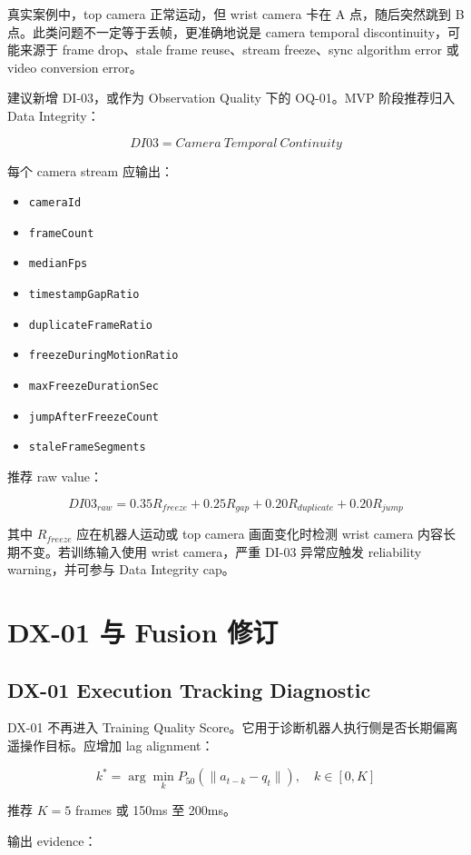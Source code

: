 \documentclass[UTF8,zihao=-4]{ctexart}
\newcommand{\Code}[1]{\texttt{#1}}
\begin{document}
真实案例中，top camera 正常运动，但 wrist camera 卡在 A 点，随后突然跳到 B 点。此类问题不一定等于丢帧，更准确地说是 camera temporal discontinuity，可能来源于 frame drop、stale frame reuse、stream freeze、sync algorithm error 或 video conversion error。

建议新增 DI-03，或作为 Observation Quality 下的 OQ-01。MVP 阶段推荐归入 Data Integrity：

\[
DI03=Camera\ Temporal\ Continuity
\]

每个 camera stream 应输出：

\begin{itemize}
\item \Code{cameraId}
\item \Code{frameCount}
\item \Code{medianFps}
\item \Code{timestampGapRatio}
\item \Code{duplicateFrameRatio}
\item \Code{freezeDuringMotionRatio}
\item \Code{maxFreezeDurationSec}
\item \Code{jumpAfterFreezeCount}
\item \Code{staleFrameSegments}
\end{itemize}

推荐 raw value：

\[
DI03_{raw}=0.35R_{freeze}+0.25R_{gap}+0.20R_{duplicate}+0.20R_{jump}
\]

其中 \(R_{freeze}\) 应在机器人运动或 top camera 画面变化时检测 wrist camera 内容长期不变。若训练输入使用 wrist camera，严重 DI-03 异常应触发 reliability warning，并可参与 Data Integrity cap。

\section{DX-01 与 Fusion 修订}

\subsection{DX-01 Execution Tracking Diagnostic}

DX-01 不再进入 Training Quality Score。它用于诊断机器人执行侧是否长期偏离遥操作目标。应增加 lag alignment：

\[
k^*=\arg\min_k P_{50}(\|a_{t-k}-q_t\|),\quad k\in[0,K]
\]

推荐 \(K=5\) frames 或 150ms 至 200ms。

输出 evidence：
\end{document}
